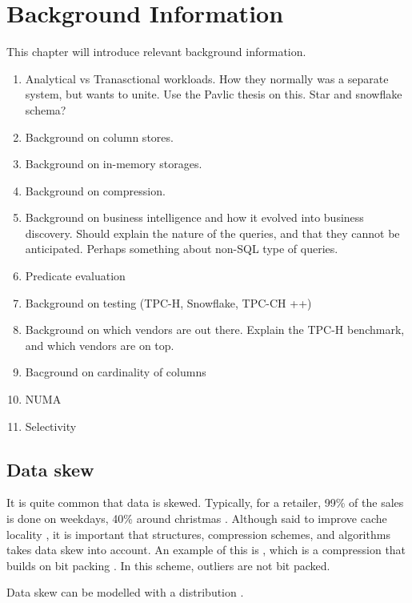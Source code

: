 \chapter{Background Information}
\label{chap:background}
\begin{secex}
This chapter will introduce relevant background information.
\begin{enumerate}
  \item Analytical vs Tranasctional workloads. How they normally was a separate system, but wants to unite. Use the Pavlic thesis on this. Star and snowflake schema?
  \item Background on column stores.
  \item Background on in-memory storages.
  \item Background on compression.
  \item Background on business intelligence and how it evolved into business discovery. Should explain the nature of the queries, and that they cannot be anticipated. Perhaps something about non-SQL type of queries.
  \item Predicate evaluation
  \item Background on testing (TPC-H, Snowflake, TPC-CH ++)
  \item Background on which vendors are out there. Explain the TPC-H benchmark, and which vendors are on top.
  \item Bacground on cardinality of columns
  \item NUMA
  \item Selectivity
\end{enumerate}
\end{secex}
\clearpage





\section{Data skew}
\label{sec:Data skew}
It is quite common that data is skewed. Typically, for a retailer, 99\% of the sales is done on weekdays, 40\% around christmas \cite{Raman2008-gi}. Although said to improve cache locality \cite{Larson2013-mc}, it is important that structures, compression schemes, and algorithms takes data skew into account. An example of this is , which is a compression that builds on bit packing \cite{Bjorklund2011-wh}. In this scheme, outliers are not bit packed.

Data skew can be modelled with a  distribution \cite{Holloway2008-rr}.


